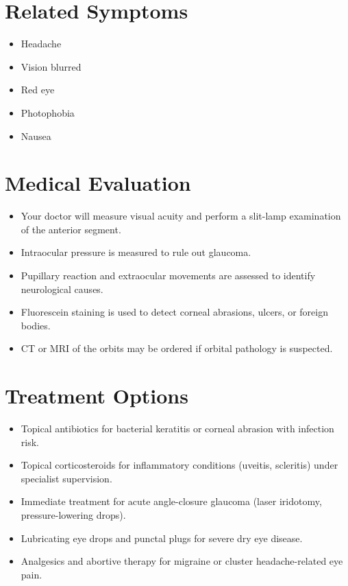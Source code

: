 \section*{Related Symptoms}
\begin{itemize}
  \item Headache
  \item Vision blurred
  \item Red eye
  \item Photophobia
  \item Nausea
\end{itemize}


\section*{Medical Evaluation}
\begin{itemize}
  \item Your doctor will measure visual acuity and perform a slit-lamp examination of the anterior segment.
  \item Intraocular pressure is measured to rule out glaucoma.
  \item Pupillary reaction and extraocular movements are assessed to identify neurological causes.
  \item Fluorescein staining is used to detect corneal abrasions, ulcers, or foreign bodies.
  \item CT or MRI of the orbits may be ordered if orbital pathology is suspected.
\end{itemize}

\section*{Treatment Options}
\begin{itemize}
  \item Topical antibiotics for bacterial keratitis or corneal abrasion with infection risk.
  \item Topical corticosteroids for inflammatory conditions (uveitis, scleritis) under specialist supervision.
  \item Immediate treatment for acute angle-closure glaucoma (laser iridotomy, pressure-lowering drops).
  \item Lubricating eye drops and punctal plugs for severe dry eye disease.
  \item Analgesics and abortive therapy for migraine or cluster headache-related eye pain.
\end{itemize}


